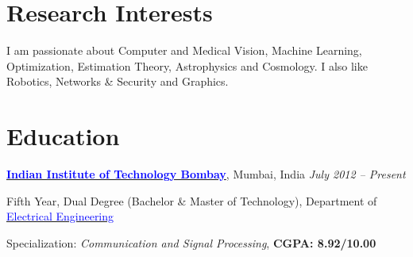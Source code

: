 \documentclass[margin,line]{res}
\newenvironment{list1}{
  \begin{list}{\ding{113}}{%
      \setlength{\itemsep}{0in}
      \setlength{\parsep}{0in} \setlength{\parskip}{0in}
      \setlength{\topsep}{0in} \setlength{\partopsep}{0in} 
      \setlength{\leftmargin}{0.17in}}}{\end{list}}
\begin{document}

\begin{resume}


\section{\sc Research Interests}
I am passionate about Computer and Medical Vision, Machine Learning, Optimization, Estimation Theory, Astrophysics and Cosmology. I also like Robotics, Networks \& Security and Graphics.

\vspace*{-0.13in}

\section{\sc Education}
{\bf \href{http://www.iitb.ac.in/}{\textcolor{blue}{Indian Institute of Technology Bombay}}}, Mumbai, India \hfill {\it July 2012 -- Present} \\
\vspace*{-.1in}
\begin{list1}
\item[] Fifth Year, Dual Degree (Bachelor \& Master of Technology), Department of \href{http://www.ee.iitb.ac.in/}{\textcolor{blue}{Electrical Engineering}}
\item[] Specialization: {\em Communication and Signal Processing}, {\bf CGPA: 8.92/10.00}
\end{list1}


\end{resume}
\end{document}
